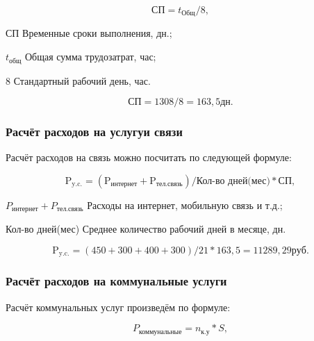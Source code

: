 \begin{equation}
    \text{СП} = t_\text{Общ} / 8,
\end{equation}

\begin{eqexpl}[25mm]
    \item{СП} Временные сроки выполнения, дн.;
    \item{$t_\text{общ}$} Общая сумма трудозатрат, час;
    \item{8} Стандартный рабочий день, час.
\end{eqexpl}

\begin{equation*}
    \text{СП} = 1308 / 8 = 163,5 дн.
\end{equation*}

\subsubsection{Расчёт расходов на услугуи связи}

Расчёт расходов на связь можно посчитать по следующей формуле:

\begin{equation}
    \text{P}_\text{y.c.} = (\text{P}_\text{интернет} + \text{P}_\text{тел.связь}) / \text{Кол-во дней(мес)} * \text{СП},
\end{equation}

\begin{eqexpl}[57mm]
    \item{$P_\text{интернет} + P_\text{тел.связь}$} Расходы на интернет, мобильную связь и т.д.;
    \item{Кол-во дней(мес)} Среднее количество рабочий дней в месяце, дн.
\end{eqexpl}

\begin{equation*}
    \text{P}_\text{y.c.} = (450 + 300 + 400 + 300) / 21 * 163,5 = 11289,29 руб.
\end{equation*}

\subsubsection{Расчёт расходов на коммунальные услуги}

Расчёт коммунальных услуг произведём по формуле:

\begin{equation}
    P_\text{коммунальные} = n_\text{к.у} * S,
\end{equation}

